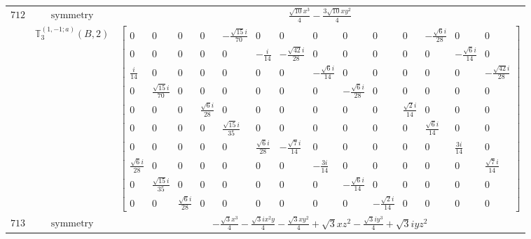 \documentclass[fleqn,8pt,landscape]{jsarticle}
\begin{document}
\begin{longtable}{ccc}
$ 712 $ & $ \text{symmetry} $ & $ \frac{\sqrt{10} x^{3}}{4} - \frac{3 \sqrt{10} x y^{2}}{4} $ \\
$  $ & $ \mathbb{T}_{3}^{(1,-1;a)}(B,2) $ & $ \begin{bmatrix} 0 & 0 & 0 & 0 & - \frac{\sqrt{15} i}{70} & 0 & 0 & 0 & 0 & 0 & 0 & - \frac{\sqrt{6} i}{28} & 0 & 0 \\ 0 & 0 & 0 & 0 & 0 & - \frac{i}{14} & - \frac{\sqrt{42} i}{28} & 0 & 0 & 0 & 0 & 0 & - \frac{\sqrt{6} i}{14} & 0 \\ \frac{i}{14} & 0 & 0 & 0 & 0 & 0 & 0 & - \frac{\sqrt{6} i}{14} & 0 & 0 & 0 & 0 & 0 & - \frac{\sqrt{42} i}{28} \\ 0 & \frac{\sqrt{15} i}{70} & 0 & 0 & 0 & 0 & 0 & 0 & - \frac{\sqrt{6} i}{28} & 0 & 0 & 0 & 0 & 0 \\ 0 & 0 & 0 & \frac{\sqrt{6} i}{28} & 0 & 0 & 0 & 0 & 0 & 0 & \frac{\sqrt{2} i}{14} & 0 & 0 & 0 \\ 0 & 0 & 0 & 0 & \frac{\sqrt{15} i}{35} & 0 & 0 & 0 & 0 & 0 & 0 & \frac{\sqrt{6} i}{14} & 0 & 0 \\ 0 & 0 & 0 & 0 & 0 & \frac{\sqrt{6} i}{28} & - \frac{\sqrt{7} i}{14} & 0 & 0 & 0 & 0 & 0 & \frac{3 i}{14} & 0 \\ \frac{\sqrt{6} i}{28} & 0 & 0 & 0 & 0 & 0 & 0 & - \frac{3 i}{14} & 0 & 0 & 0 & 0 & 0 & \frac{\sqrt{7} i}{14} \\ 0 & \frac{\sqrt{15} i}{35} & 0 & 0 & 0 & 0 & 0 & 0 & - \frac{\sqrt{6} i}{14} & 0 & 0 & 0 & 0 & 0 \\ 0 & 0 & \frac{\sqrt{6} i}{28} & 0 & 0 & 0 & 0 & 0 & 0 & - \frac{\sqrt{2} i}{14} & 0 & 0 & 0 & 0 \end{bmatrix} $ \\ \hline
$ 713 $ & $ \text{symmetry} $ & $ - \frac{\sqrt{3} x^{3}}{4} - \frac{\sqrt{3} i x^{2} y}{4} - \frac{\sqrt{3} x y^{2}}{4} + \sqrt{3} x z^{2} - \frac{\sqrt{3} i y^{3}}{4} + \sqrt{3} i y z^{2} $ \\

\end{longtable}
\end{document}
